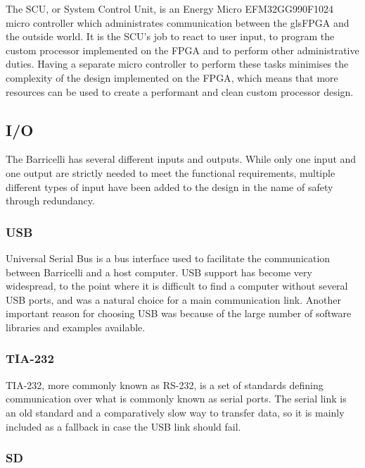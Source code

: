 The \gls{SCU}, or System Control Unit, is an Energy Micro EFM32GG990F1024 micro controller which administrates communication between the gls{FPGA} and the outside world.
It is the \gls{SCU}'s job to react to user input, to program the custom processor implemented on the FPGA and to perform other administrative duties.
Having a separate micro controller to perform these tasks minimises the complexity of the design implemented on the \gls{FPGA}, which means that more resources can be used to create a performant and clean custom processor design.

\subsection{I/O}

The Barricelli has several different inputs and outputs.
While only one input and one output are strictly needed to meet the functional requirements, multiple different types of input have been added to the design in the name of safety through redundancy.

\subsubsection{USB}

Universal Serial Bus is a bus interface used to facilitate the communication between Barricelli and a host computer.
USB support has become very widespread, to the point where it is difficult to find a computer without several USB ports, and was a natural choice for a main communication link.
Another important reason for choosing USB was because of the large number of software libraries and examples available.

\subsubsection{TIA-232}

TIA-232, more commonly known as RS-232, is a set of standards defining communication over what is commonly known as serial ports.
The serial link is an old standard and a comparatively slow way to transfer data, so it is mainly included as a fallback in case the USB link should fail.

\subsubsection{SD}



